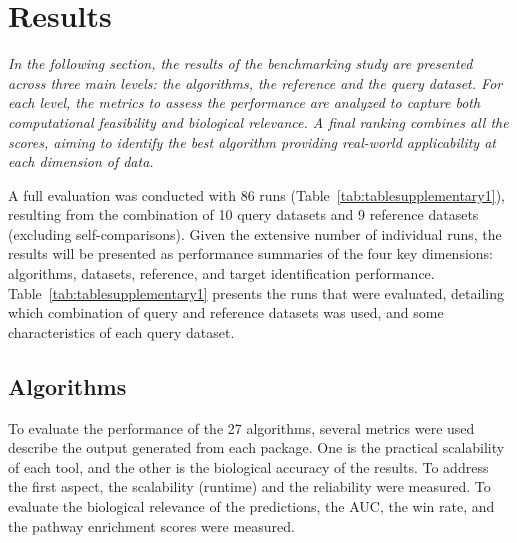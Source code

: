 ﻿%

%


\chapter{Results}
\label{cha:results}

\textit{In the following section, the results of the benchmarking study are presented across three main levels: the algorithms, the reference and the query dataset. For each level, the metrics to assess the performance are analyzed to capture both computational feasibility and biological relevance. A final ranking combines all the scores, aiming to identify the best algorithm providing real-world applicability at each dimension of data.}

A full evaluation was conducted with 86 runs (Table~\ref{tab:tablesupplementary1}), resulting from the combination of 10 query datasets and 9 reference datasets (excluding self-comparisons). Given the extensive number of individual runs, the results will be presented as performance summaries of the four key dimensions: algorithms, datasets, reference, and target identification performance. Table~\ref{tab:tablesupplementary1} presents the runs that were evaluated, detailing which combination of query and reference datasets was used, and some characteristics of each query dataset.

\section{Algorithms} %
\label{sec:algorithmsresults}

To evaluate the performance of the 27 algorithms, several metrics were used describe  the output generated from each package. One is the practical scalability of each tool, and the other is the biological accuracy of the results. To address the first aspect, the scalability (runtime) and the reliability were measured. To evaluate the biological relevance of the predictions, the \gls{AUC}, the win rate, and the pathway enrichment scores were measured.


